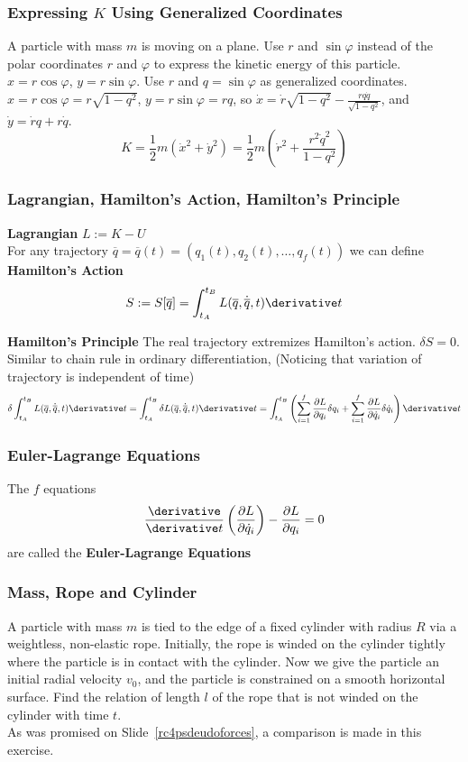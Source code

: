 \begin{frame}
\frametitle{Expressing $K$ Using Generalized Coordinates}
A particle with mass $m$ is moving on a plane. Use $r$ and $\sin\varphi$ instead of the polar coordinates $r$ and $\varphi$ to express the \alert{kinetic energy} of this particle.\\
$x=r\cos\varphi$, $y=r\sin\varphi$. Use $r$ and $q=\sin\varphi$ as generalized coordinates.
$x=r\cos\varphi=r\sqrt{1-q^2}$, $y=r\sin\varphi=rq$, so $\dot x=\dot r\sqrt{1-q^2}-\frac{rq\dot q}{\sqrt{1-q^2}}$, and $\dot y=\dot r q+r\dot q$.
\[K=\frac{1}{2}m(\dot{x}^{2}+\dot{y}^2)=\frac{1}{2}m(\dot{r}^2+\frac{r^2\dot{q}^2}{1-q^2})\]
\end{frame}
\begin{frame}
\frametitle{Lagrangian, Hamilton's Action, Hamilton's Principle}
\begin{definition}
\textbf{\alert{Lagrangian}} $L:=K-U$\\
For any \alert{trajectory} $\overline{q}=\overline{q}(t)=(q_1(t),q_2(t),\dots,q_f(t))$ we can define \alert{\textbf{Hamilton's Action}}
\[S:=S[\overline{q}]=\int_{t_{A}}^{t_{B}}L(\overline{q},\dot{\overline{q}},t)\derivative t\]
\end{definition}
\textbf{\alert{Hamilton's Principle}}
The real trajectory \alert{extremizes} Hamilton's action. $\delta S=0$. Similar to \alert{chain rule} in \alert{ordinary differentiation}, (Noticing that variation of trajectory is \alert{independent} of time)
\[\delta\int_{t_A}^{t_B}L(\overline{q},\dot{\overline{q}},t)\derivative t=\int_{t_A}^{t_B}\delta L(\overline{q},\dot{\overline{q}},t)\derivative t=\int_{t_A}^{t_B}\left(\sum_{i=1}^{f}\frac{\partial L}{\partial q_i}\delta q_i+\sum_{i=1}^{f}\frac{\partial L}{\partial \dot q_i}\delta \dot q_i\right)\derivative t\]
\end{frame}
\begin{frame}
\frametitle{Euler-Lagrange Equations}
The $f$ equations
\[\frac{\derivative}{\derivative t}\left(\frac{\partial L}{\partial\dot q_i}\right)-\frac{\partial L}{\partial q_i}=0\]
are called the \alert{\textbf{Euler-Lagrange Equations}}
\end{frame}
\begin{frame}\label{rc6solutionnoninertialfor}
\frametitle{Mass, Rope and Cylinder}
A particle with mass $m$ is tied to the \alert{edge} of a \alert{fixed} cylinder with radius $R$ via a \alert{weightless, non-elastic} rope. Initially, the rope is winded on the cylinder tightly where the particle is in contact with the cylinder.  Now we give the particle an initial \alert{radial} velocity $v_0$, and the particle is constrained on a \alert{smooth horizontal} surface. Find the relation of length $l$ of the rope that is \alert{not} winded on the cylinder with time $t$.\\
As was promised on Slide~\ref{rc4psdeudoforces}, a comparison is made in this exercise.
\end{frame}
